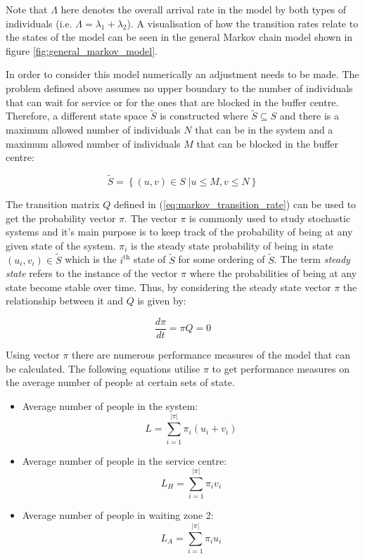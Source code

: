 Note that \(\Lambda\) here denotes the overall arrival rate in the model by both 
types of individuals (i.e. \(\Lambda = \lambda_1 + \lambda_2\)). 
A visualisation of how the transition rates relate to the states of the model 
can be seen in the general Markov chain model shown in figure 
\ref{fig:general_markov_model}.




In order to consider this model numerically an adjustment needs to be made. 
The problem defined above assumes no upper boundary to the number of individuals 
that can wait for service or for the ones that are blocked in the buffer centre. 
Therefore, a different state space \( \tilde S \) is constructed where 
\( \tilde S \subseteq S \) and there is a maximum allowed number of individuals 
\(N\) that can be in the system and a maximum allowed number of individuals 
\(M\) that can be blocked in the buffer centre:

\begin{equation}
    \tilde S = \left\{ (u, v) \in S\;| u \leq M, v\leq N \right\}
\end{equation}


The transition matrix \( Q \) defined in (\ref{eq:markov_transition_rate}) can 
be used to get the probability vector \( \pi \).
The vector \( \pi \) is commonly used to study stochastic systems and it's main
purpose is to keep track of the probability of being at any given state of 
the system. 
\(\pi_i\) is the steady state probability of being in state \((u_i, v_i) \in 
\tilde S\) which is the \(i^{\text{th}}\) state of \(\tilde S\) for some ordering of 
\(\tilde S\).
The term \textit{steady state} refers to the instance of the vector \( \pi \) 
where the probabilities of being at any state become stable over time. 
Thus, by considering the steady state vector \( \pi \) the relationship between 
it and \( Q \) is given by:

\[
    \frac{d\pi}{dt} = \pi Q = 0
\]

Using vector \(\pi\) there are numerous performance measures of the model that 
can be calculated. 
The following equations utilise \(\pi\) to get performance measures on the 
average number of people at certain sets of state.

\begin{itemize}
    \item Average number of people in the system: 
        \[L = \sum_{i=1}^{|\pi|} \pi_i (u_i + v_i)\]
    \item Average number of people in the service centre: 
        \[L_H = \sum_{i=1}^{|\pi|} \pi_i v_i\]
    \item Average number of people in waiting zone 2:
        \[L_A = \sum_{i=1}^{|\pi|} \pi_i u_i\] 
\end{itemize}

